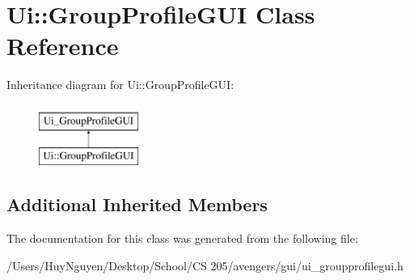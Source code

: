 \hypertarget{classUi_1_1GroupProfileGUI}{}\section{Ui\+:\+:Group\+Profile\+G\+UI Class Reference}
\label{classUi_1_1GroupProfileGUI}
Inheritance diagram for Ui\+:\+:Group\+Profile\+G\+UI\+:\begin{figure}[H]
\begin{center}
\leavevmode
\includegraphics[height=2.000000cm]{classUi_1_1GroupProfileGUI}
\end{center}
\end{figure}
\subsection*{Additional Inherited Members}


The documentation for this class was generated from the following file\+:\begin{DoxyCompactItemize}
\item 
/\+Users/\+Huy\+Nguyen/\+Desktop/\+School/\+C\+S 205/avengers/gui/ui\+\_\+groupprofilegui.\+h\end{DoxyCompactItemize}
